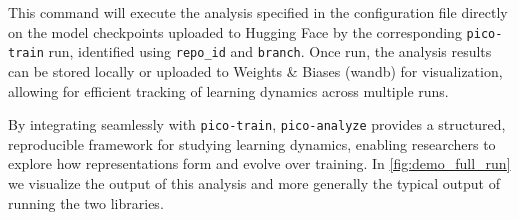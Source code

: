 This command will execute the analysis specified in the configuration file directly on the model checkpoints uploaded to Hugging Face by the corresponding \texttt{pico-train} run, identified using \verb|repo_id| and \verb|branch|. Once run, the analysis results can be stored locally or uploaded to Weights \& Biases (wandb) \citep{wandb} for visualization, allowing for efficient tracking of learning dynamics across multiple runs.  

By integrating seamlessly with \texttt{pico-train}, \texttt{pico-analyze} provides a structured, reproducible framework for studying learning dynamics, enabling researchers to explore how representations form and evolve over training. In \cref{fig:demo_full_run} we visualize the output of this analysis and more generally the typical output of running the two libraries. 

